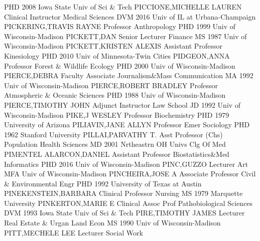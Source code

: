 \documentclass[
]{article}
\begin{document}
\textbar PHD 2008 Iowa State Univ of Sci \& Tech \textbar{} 
\textbar PICCIONE,MICHELLE LAUREN \textbar Clinical Instructor
\textbar Medical Sciences \textbar DVM 2016 Univ of IL at
Urbana-Champaign \textbar{}  \textbar PICKERING,TRAVIS RAYNE
\textbar Professor \textbar Anthropology \textbar PHD 1999 Univ of
Wisconsin-Madison \textbar{}  \textbar PICKETT,DAN
\textbar Senior Lecturer \textbar Finance \textbar MS 1987 Univ of
Wisconsin-Madison \textbar{}  \textbar PICKETT,KRISTEN
ALEXIS \textbar Assistant Professor \textbar Kinesiology \textbar PHD
2010 Univ of Minnesota-Twin Cities \textbar{} 
\textbar PIDGEON,ANNA \textbar Professor \textbar Forest \& Wildlife
Ecology \textbar PHD 2000 Univ of Wisconsin-Madison \textbar{}
 \textbar PIERCE,DEBRA \textbar Faculty Associate
\textbar Journalism\&Mass Communication \textbar MA 1992 Univ of
Wisconsin-Madison \textbar{}  \textbar PIERCE,ROBERT BRADLEY
\textbar Professor \textbar Atmospheric \& Oceanic Sciences \textbar PHD
1988 Univ of Wisconsin-Madison \textbar{} 
\textbar PIERCE,TIMOTHY JOHN \textbar Adjunct Instructor \textbar Law
School \textbar JD 1992 Univ of Wisconsin-Madison \textbar{}
 \textbar PIKE,J WESLEY \textbar Professor
\textbar Biochemistry \textbar PHD 1979 University of Arizona \textbar{}
 \textbar PILIAVIN,JANE ALLYN \textbar Professor Emer
\textbar Sociology \textbar PHD 1962 Stanford University \textbar{}
 \textbar PILLAI,PARVATHY T. \textbar Asst Professor (Chs)
\textbar Population Health Sciences \textbar MD 2001 Nrtheastrn OH Univs
Clg Of Med \textbar{}  \textbar PIMENTEL ALARCON,DANIEL
\textbar Assistant Professor \textbar Biostatistics\&Med Informatics
\textbar PHD 2016 Univ of Wisconsin-Madison \textbar{} 
\textbar PINC,GUZZO \textbar Lecturer \textbar Art \textbar MFA Univ of
Wisconsin-Madison \textbar{}  \textbar PINCHEIRA,JOSE A
\textbar Associate Professor \textbar Civil \& Environmental Engr
\textbar PHD 1992 University of Texas at Austin \textbar{} 
\textbar PINEKENSTEIN,BARBARA \textbar Clinical Professor
\textbar Nursing \textbar MS 1979 Marquette University \textbar{}
 \textbar PINKERTON,MARIE E \textbar Clinical Assoc Prof
\textbar Pathobiological Sciences \textbar DVM 1993 Iowa State Univ of
Sci \& Tech \textbar{}  \textbar PIRE,TIMOTHY JAMES
\textbar Lecturer \textbar Real Estate \& Urgan Land Econ \textbar MS
1990 Univ of Wisconsin-Madison \textbar{} 
\textbar PITT,MECHELE LEE \textbar Lecturer \textbar Social Work
\end{document}
